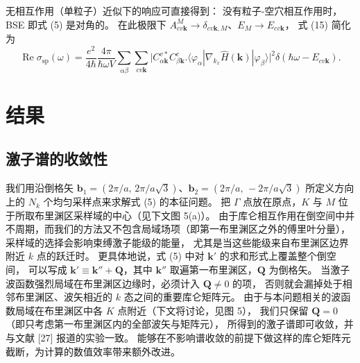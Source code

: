 \documentclass[11pt,a4paper]{ctexart}
\begin{document}
无相互作用（单粒子）近似下的响应可直接得到：
没有粒子-空穴相互作用时，BSE 即式 (5) 是对角的。
在此极限下 $A^{M}_{cv\mathbf k}\to\delta_{cv\mathbf k,M}$、$E_M\to E_{cv\mathbf k}$，
式 (15) 简化为
\begin{equation}
\operatorname{Re}\sigma_{\mathrm{sp}}(\omega)
=\frac{e^2}{4\hbar}\frac{4\pi}{\hbar\omega V}
\sum_{\alpha\beta}\sum_{cv\mathbf k}\Biggl|
C^{v*}_{\alpha\mathbf k}C^{c}_{\beta\mathbf k}
\Biggl.\langle\varphi_\alpha|\nabla_{k_x}\hat H(\mathbf k)|\varphi_\beta\rangle
\Biggr|^2\delta(\hbar\omega-E_{cv\mathbf k}).
\end{equation}

\section{结果}
\subsection{激子谱的收敛性}

我们用沿倒格矢 $\mathbf b_1=(2\pi/a,\,2\pi/a\sqrt3)$、$\mathbf b_2=(2\pi/a,\,-2\pi/a\sqrt3)$
所定义方向上的 $N_k$ 个均匀采样点来求解式 (5) 的本征问题。
把 $\Gamma$ 点放在原点，$K$ 与 $M$ 位于所取布里渊区采样域的中心（见下文图 5(a)）。
由于库仑相互作用在倒空间中并不周期，而我们的方法又不包含局域场项（即第一布里渊区之外的傅里叶分量），
采样域的选择会影响束缚激子能级的能量，
尤其是当这些能级来自布里渊区边界附近 $k$ 点的跃迁时。
更具体地说，式 (5) 中对 $\mathbf k'$ 的求和形式上覆盖整个倒空间，
可以写成 $\mathbf k'\equiv\mathbf k''+\mathbf Q$，其中 $\mathbf k''$ 取遍第一布里渊区，$\mathbf Q$ 为倒格矢。
当激子波函数强烈局域在布里渊区边缘时，必须计入 $\mathbf Q\ne0$ 的项，
否则就会漏掉处于相邻布里渊区、波矢相近的 $k$ 态之间的重要库仑矩阵元。
由于与本问题相关的波函数局域在布里渊区中各 $K$ 点附近（下文将讨论，见图 5），
我们只保留 $\mathbf Q=0$（即只考虑第一布里渊区内的全部波矢与矩阵元），
所得到的激子谱即可收敛，并与文献 [27] 报道的实验一致。
能够在不影响谱收敛的前提下做这样的库仑矩阵元截断，为计算的数值效率带来额外改进。
\end{document}
